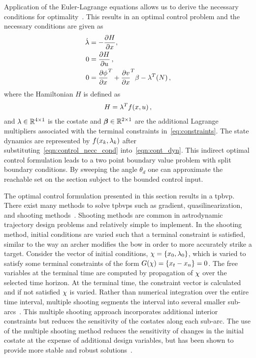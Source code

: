 Application of the Euler-Lagrange equations allows us to derive the necessary conditions for optimality~\cite{bryson1975}.
This results in an optimal control problem and the necessary conditions are given as
\begin{subequations}\label{eq:necc_cond}
\begin{align}
    \dot{\lambda} &= - \frac{\partial H}{\partial x}, \\
        0 &=  \frac{\partial H}{\partial u} \, , \label{eqn:control_necc_cond}\\
        0 &= \frac{\partial \phi}{\partial x}^T + \frac{\partial v}{\partial x}^T \beta  - \lambda^T(N) \, ,  
\end{align}
\end{subequations}
where the Hamiltonian \(H\) is defined as
\begin{equation}
        H = \lambda^T f(x, u) \, ,
        \label{eq:hamiltonian_opt}
\end{equation}
and \( \lambda \in \mathbb{R}^{4 \times 1} \) is the costate and \(\bm{\beta} \in \mathbb{R}^{2 \times 1} \) are the additional Lagrange multipliers associated with the terminal constraints in~\cref{eq:constraints}.
The state dynamics are represented by \( f(x_k, \lambda_k ) \) after substituting~\cref{eqn:control_necc_cond} into~\cref{eqn:cont_dyn}.
This indirect optimal control formulation leads to a two point boundary value problem with split boundary conditions. 
By sweeping the angle \( \theta_d \) one can approximate the reachable set on the \Poincare section subject to the bounded control input. 

The optimal control formulation presented in this section results in a \gls{tpbvp}. 
There exist many methods to solve \glspl{tpbvp} such as gradient, quasilinearization, and shooting methods~\cite{bryson1975,kirk2012}.
Shooting methods are common in astrodynamic trajectory design problems and relatively simple to implement.
In the shooting method, initial conditions are varied such that a terminal constraint is satisfied, similar to the way an archer modifies the bow in order to more accurately strike a target. 
Consider the vector of initial conditions, \( \chi = \left\{ x_0, \lambda_0 \right\}\), which is varied to satisfy some terminal constraints of the form \( G(\chi) = \left\{ x_t - x_n \right\} = 0 \).
The free variables at the terminal time are computed by propagation of \( \chi \) over the selected time horizon. 
At the terminal time, the constraint vector is calculated and if not satisfied \( \chi\) is varied.
Rather than numerical integration over the entire time interval, multiple shooting segments the interval into several smaller sub-arcs~\cite{stoer2013}.
This multiple shooting approach incorporates additional interior constraints but reduces the sensitivity of the costates along each sub-arc.
The use of the multiple shooting method reduces the sensitivity of changes in the initial costate at the expense of additional design variables, but has been shown to provide more stable and robust solutions~\cite{ozimek2010a}.

